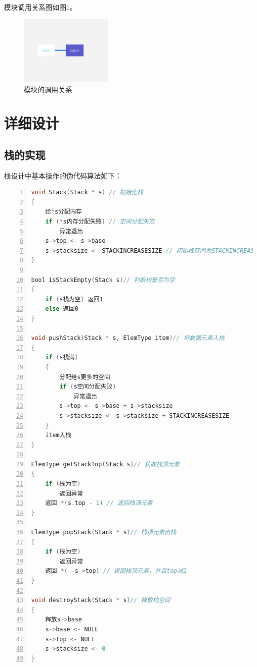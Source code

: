 \documentclass{article}
\begin{document}
模块调用关系图如图1。

\begin{figure}[htbp]
    
    \centering\includegraphics[width=0.4\textwidth]{./Images/pic2_1.png}
    
    \caption{模块的调用关系}
    
\end{figure}

\section{详细设计}

\subsection{栈的实现}

栈设计中基本操作的伪代码算法如下：
\begin{lstlisting}[language={C},
    numbers=left,
    numberstyle=\tiny\consolas,
    basicstyle=\small\consolas]
void Stack(Stack * s) // 初始化栈
{    
    给*s分配内存
    if (*s内存分配失败) // 空间分配失败
        异常退出
    s->top <- s->base
    s->stacksize <- STACKINCREASESIZE // 初始栈空间为STACKINCREASESIZE
}

bool isStackEmpty(Stack s)// 判断栈是否为空
{
    if (s栈为空) 返回1
    else 返回0
}

void pushStack(Stack * s, ElemType item)// 将数据元素入栈
{
    if (s栈满) 
    {
        分配给s更多的空间
        if (s空间分配失败)
            异常退出
        s->top <- s->base + s->stacksize
        s->stacksize <- s->stacksize + STACKINCREASESIZE
    }
    item入栈
}

ElemType getStackTop(Stack s)// 获取栈顶元素
{
    if (栈为空)
        返回异常
    返回 *(s.top - 1) // 返回栈顶元素
}

ElemType popStack(Stack * s)// 栈顶元素出栈
{
    if (栈为空)
        返回异常 
    返回 *(--s->top) // 返回栈顶元素，并且top减1
}

void destroyStack(Stack * s)// 释放栈空间
{
    释放s->base
    s->base <- NULL
    s->top <- NULL
    s->stacksize <- 0
}
\end{lstlisting}
\end{document}
